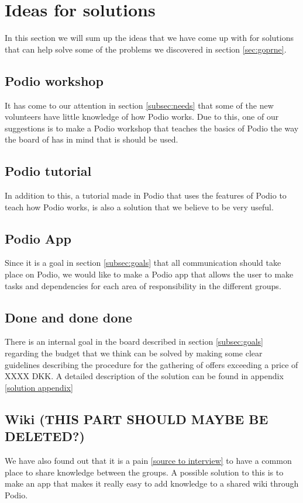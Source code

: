 \section{Ideas for solutions}
\label{sec:ideas}
In this section we will sum up the ideas that we have come up with for solutions
that can help solve some of the problems we discovered in section \ref{sec:goprne}.

\subsection{Podio workshop}
It has come to our attention in section \ref{subsec:needs} that
some of the new volunteers have little knowledge of how Podio works. Due to
this, one of our suggestions is to make a Podio workshop that teaches the basics
of Podio the way the board of \mil has in mind that is should be used.

\subsection{Podio tutorial}
In addition to this, a tutorial made in Podio that uses the features of Podio to
teach how Podio works, is also a solution that we believe to be very useful.

\subsection{Podio App}
Since it is a goal in section \ref{subsec:goals} that all communication should take place
on Podio, we would like to make a Podio app that allows the user to make tasks
and dependencies for each area of responsibility in the different groups.

\subsection{Done and done done}
There is an internal goal in the board described in section \ref{subsec:goals} regarding the
budget that we think can be solved by making some clear guidelines describing
the procedure for the gathering of offers exceeding a price of XXXX DKK. A
detailed description of the solution can be found in appendix \ref{solution
appendix}

\subsection{Wiki (THIS PART SHOULD MAYBE BE DELETED?)}
We have also found out that it is a pain \ref{source to interview} to have a
common place to share knowledge between the groups. A possible solution to this
is to make an app that makes it really easy to add knowledge to a shared wiki
through Podio.

